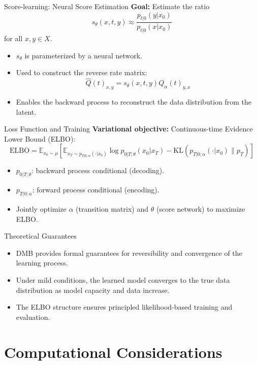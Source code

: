 \documentclass{beamer}
\begin{document}
\begin{frame}{Score-learning: Neural Score Estimation}
  \textbf{Goal:} Estimate the ratio
  \[
    s_\theta(x, t, y) \approx \frac{p_{t|0}(y|x_0)}{p_{t|0}(x|x_0)}
  \]
  for all $x, y \in X$.
  \begin{itemize}
    \item $s_\theta$ is parameterized by a neural network.
    \item Used to construct the reverse rate matrix:
      \[
        \hat{Q}(t)_{x,y} = s_\theta(x, t, y) Q_\alpha(t)_{y,x}
      \]
    \item Enables the backward process to reconstruct the data distribution from the latent.
  \end{itemize}
\end{frame}

\begin{frame}{Loss Function and Training}
  \textbf{Variational objective:} Continuous-time Evidence Lower Bound (ELBO):
  \[
    \mathrm{ELBO} = \mathbb{E}_{x_0 \sim \mu} \left[ \mathbb{E}_{x_T \sim p_{T|0;\alpha}(\cdot | x_0)} \log p_{0|T;\theta}(x_0 | x_T) - \mathrm{KL}(p_{T|0;\alpha}(\cdot | x_0) \| p_T) \right]
  \]
  \begin{itemize}
    \item $p_{0|T;\theta}$: backward process conditional (decoding).
    \item $p_{T|0;\alpha}$: forward process conditional (encoding).
    \item Jointly optimize $\alpha$ (transition matrix) and $\theta$ (score network) to maximize ELBO.
  \end{itemize}
\end{frame}

\begin{frame}{Theoretical Guarantees}
  \begin{itemize}
    \item DMB provides formal guarantees for reversibility and convergence of the learning process.
    \item Under mild conditions, the learned model converges to the true data distribution as model capacity and data increase.
    \item The ELBO structure ensures principled likelihood-based training and evaluation.
  \end{itemize}
\end{frame}

\section{Computational Considerations}
\end{document}
